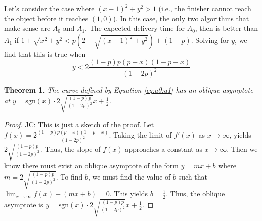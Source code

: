 \documentclass{article}
\newcommand\JC[1]{{\color{Maroon} JC: #1}}         %
\newtheorem{theorem}{Theorem}[section]
\begin{document}
Let's consider the case where $(x-1)^2 + y^2 > 1$ (i.e., the finisher cannot reach the object before it reaches $(1,0)$).
In this case, the only two algorithms that make sense are $A_0$ and $A_1$.
The expected delivery time for $A_0$, then is better than $A_1$ if $1 + \sqrt{x^2 + y^2} < p(2 + \sqrt{(x-1)^2 + y^2}) + (1-p)$.
Solving for $y$, we find that this is true when 
\begin{equation}
    y < 2 \frac{(1-p)p(p-x)(1-p-x)}{(1-2p)^2} \label{eq:a0:a1}
\end{equation}

\begin{theorem}
    The curve defined by Equation \ref{eq:a0:a1} has an oblique asymptote at $y = \text{sgn}(x) \cdot 2 \sqrt{\frac{(1-p)p}{(1-2p)^2}}x + \frac{1}{2}$.
\end{theorem}
\begin{proof}
    \JC{This is just a sketch of the proof.}
    Let $f(x) = 2 \frac{(1-p)p(p-x)(1-p-x)}{(1-2p)^2}$.
    Taking the limit of $f'(x)$ as $x \to \infty$, yields $2 \sqrt{\frac{(1-p)p}{(1-2p)^2}}$.
    Thus, the slope of $f(x)$ approaches a constant as $x \to \infty$.
    Then we know there must exist an oblique asymptote of the form $y = mx + b$ where $m = 2 \sqrt{\frac{(1-p)p}{(1-2p)^2}}$.
    To find $b$, we must find the value of $b$ such that $\lim_{x \to \infty} f(x) - (m x + b) = 0$.
    This yields $b = \frac{1}{2}$. Thus, the oblique asymptote is $y = \text{sgn}(x) \cdot 2 \sqrt{\frac{(1-p)p}{(1-2p)^2}}x + \frac{1}{2}$.
\end{proof}


\end{document}
